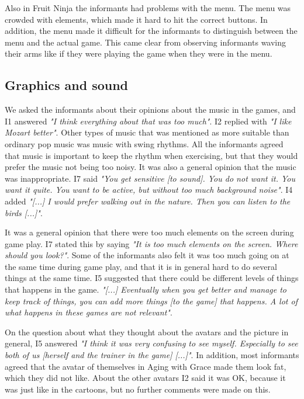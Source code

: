 Also in Fruit Ninja the informants had problems with the menu. The menu was crowded with elements, which made it hard to hit the correct buttons. In addition, the menu made it difficult for the informants to distinguish between the menu and the actual game. This came clear from observing informants waving their arms like if they were playing the game when they were in the menu. 

\subsection{Graphics and sound}

We asked the informants about their opinions about the music in the games, and I1 answered \emph{"I think everything about that was too much"}. I2 replied with \emph{"I like Mozart better"}. Other types of music that was mentioned as more suitable than ordinary pop music was music with swing rhythms. All the informants agreed that music is important to keep the rhythm when exercising, but that they would prefer the music not being too noisy. It was also a general opinion that the music was inappropriate.  I7 said \emph{"You get sensitive [to sound]. You do not want it. You want it quite. You want to be active, but without too much background noise"}. I4 added \emph{"[...] I would prefer walking out in the nature. Then you can listen to the birds [...]"}.

It was a general opinion that there were too much elements on the screen during game play. I7 stated this by saying \emph{"It is too much elements on the screen. Where should you look?"}. Some of the informants also felt it was too much going on at the same time during game play, and that it is in general hard to do several things at the same time. I5 suggested that there could be different levels of things that happens in the game.  \emph{"[...] Eventually when you get better and manage to keep track of things, you can add more things [to the game] that happens. A lot of what happens in these games are not relevant"}. 

On the question about what they thought about the avatars and the picture in general, I5 answered \emph{"I think it was very confusing to see myself. Especially to see both of us [herself and the trainer in the game] [...]"}. In addition, most informants agreed that the avatar of themselves in Aging with Grace made them look fat, which they did not like. About the other avatars I2 said it was OK, because it was just like in the cartoons, but no further comments were made on this.  

